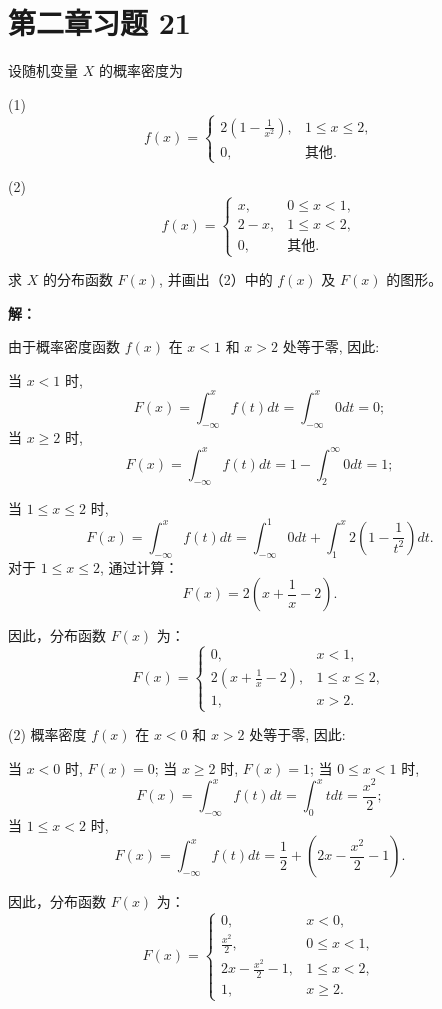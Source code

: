 \documentclass[twoside]{article}
\begin{document}
\maketitle
\vspace{-3.5em}

\tableofcontents
    
\section{第二章习题 21}

设随机变量 $X$ 的概率密度为

(1)
\[
f(x) =
\begin{cases} 
2 \left(1 - \frac{1}{x^2} \right), & 1 \leq x \leq 2, \\
0, & \text{其他}.
\end{cases}
\]

(2)
\[
f(x) =
\begin{cases} 
x, & 0 \leq x < 1, \\
2 - x, & 1 \leq x < 2, \\
0, & \text{其他}.
\end{cases}
\]

求 $X$ 的分布函数 $F(x)$, 并画出（2）中的 $f(x)$ 及 $F(x)$ 的图形。

\begin{ans}{21}{21}

    \textbf{解：}

由于概率密度函数 $f(x)$ 在 $x < 1$ 和 $x > 2$ 处等于零, 因此:

当 $x < 1$ 时,
  \[
  F(x) = \int_{-\infty}^x f(t) dt = \int_{-\infty}^x 0 dt = 0;
  \]
当 $x \geq 2$ 时,
  \[
  F(x) = \int_{-\infty}^x f(t) dt = 1 - \int_2^{\infty} 0 dt = 1;
  \]

当 $1 \leq x \leq 2$ 时,
  \[
  F(x) = \int_{-\infty}^x f(t) dt = \int_{-\infty}^1 0 dt + \int_1^x 2\left(1 - \frac{1}{t^2}\right) dt.
  \]
  对于 $1 \leq x \leq 2$, 通过计算：
  \[
  F(x) = 2\left(x + \frac{1}{x} - 2 \right).
  \]

因此，分布函数 $F(x)$ 为：
\[
F(x) =
\begin{cases} 
0, & x < 1, \\
2 \left(x + \frac{1}{x} - 2\right), & 1 \leq x \leq 2, \\
1, & x > 2.
\end{cases}
\]

(2) 概率密度 $f(x)$ 在 $x < 0$ 和 $x > 2$ 处等于零, 因此:

当 $x < 0$ 时, $F(x) = 0$;
当 $x \geq 2$ 时, $F(x) = 1$;
当 $0 \leq x < 1$ 时,
  \[
  F(x) = \int_{-\infty}^x f(t) dt = \int_0^x t dt = \frac{x^2}{2};
  \]
当 $1 \leq x < 2$ 时,
  \[
  F(x) = \int_{-\infty}^x f(t) dt = \frac{1}{2} + \left( 2x - \frac{x^2}{2} - 1 \right).
  \]

因此，分布函数 $F(x)$ 为：
\[
F(x) =
\begin{cases} 
0, & x < 0, \\
\frac{x^2}{2}, & 0 \leq x < 1, \\
2x - \frac{x^2}{2} - 1, & 1 \leq x < 2, \\
1, & x \geq 2.
\end{cases}
\]

\end{ans}
\end{document}
